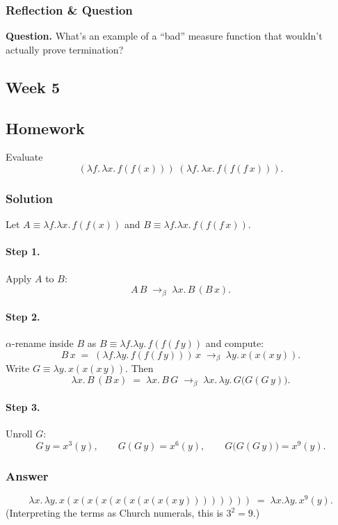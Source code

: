 \documentclass{article}
\theoremstyle{theorem}
\theoremstyle{definition}
\theoremstyle{remark}
\begin{document}
\subsubsection*{Reflection \& Question}
\textbf{Question.} What’s an example of a “bad” measure function that wouldn’t actually prove termination?

\subsection{Week 5}\label{sec:week5}
\smallskip
\subsection*{Homework}
Evaluate
\[
(\lambda f.\,\lambda x.\, f(f(x)))\;(\lambda f.\,\lambda x.\, f(f(f\,x))).
\]

\subsubsection*{Solution}
Let \(A \equiv \lambda f.\lambda x.\, f(f(x))\) and \(B \equiv \lambda f.\lambda x.\, f(f(f\,x))\).

\paragraph{Step 1.} Apply \(A\) to \(B\):
\[
A\,B \;\to_\beta\; \lambda x.\, B\,(B\,x).
\]

\paragraph{Step 2.} \(\alpha\)-rename inside \(B\) as \(B \equiv \lambda f.\lambda y.\, f(f(f\,y))\) and compute:
\[
B\,x \;=\; (\lambda f.\lambda y.\, f(f(f\,y)))\,x \;\to_\beta\; \lambda y.\, x(x(x\,y)).
\]
Write \(G \equiv \lambda y.\, x(x(x\,y))\). Then
\[
\lambda x.\, B\,(B\,x) \;=\; \lambda x.\, B\,G \;\to_\beta\; \lambda x.\, \lambda y.\, G\big(G(G\,y)\big).
\]

\paragraph{Step 3.} Unroll \(G\):
\[
G\,y = x^{3}(y),\qquad
G(G\,y) = x^{6}(y),\qquad
G\big(G(G\,y)\big) = x^{9}(y).
\]

\subsubsection*{Answer}
\[
\boxed{\lambda x.\,\lambda y.\, x(x(x(x(x(x(x(x(x\,y))))))))}
\;=\;
\lambda x.\lambda y.\, x^{9}(y).
\]
(Interpreting the terms as Church numerals, this is \(3^{2}=9\).)
\end{document}
